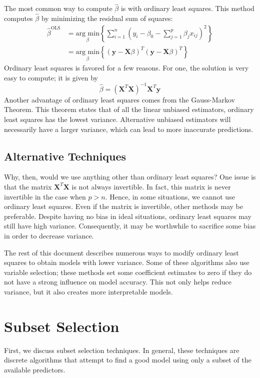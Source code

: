 \documentclass{article}
\newcommand{\argmin}[1]{\underset{\beta}{\text{arg min}}}
\begin{document}
The most common way to compute $\hat{\beta}$ is with ordinary least squares. This method computes $\hat{\beta}$ by minimizing the residual sum of squares:
\begin{align}
	\hat{\beta}^{\text{OLS}} &= \argmin{\beta}\left\{\sum_{i=1}^{n} \left( y_i - \beta_0 - \sum_{j=1}^{p} \beta_jx_{ij} \right)^2 \right\}\\
	&= \argmin{\beta} \left\{ (\mathbf{y} - \mathbf{X}\beta)^{T} (\mathbf{y} - \mathbf{X}\beta)^{T} \right\}
\end{align}
Ordinary least squares is favored for a few reasons. For one, the solution is very easy to compute; it is given by
\begin{equation}
	\hat{\beta} = (\mathbf{X}^{T}\mathbf{X})^{-1}\mathbf{X}^{T}\mathbf{y}
\end{equation}
Another advantage of ordinary least squares comes from the Gauss-Markov Theorem. This theorem states that of all the linear unbiased estimators, ordinary least squares has the lowest variance. Alternative unbiased estimators will necessarily have a larger variance, which can lead to more inaccurate predictions.

\subsection{Alternative Techniques}

Why, then, would we use anything other than ordinary least squares? One issue is that the matrix $\mathbf{X}^T\mathbf{X}$ is not always invertible. In fact, this matrix is never invertible in the case when $p>n$. Hence, in some situations, we cannot use ordinary least squares. Even if the matrix is invertible, other methods may be preferable. Despite having no bias in ideal situations, ordinary least squares may still have high variance. Consequently, it may be worthwhile to sacrifice some bias in order to decrease variance.

The rest of this document describes numerous ways to modify ordinary least squares to obtain models with lower variance. Some of these algorithms also use variable selection; these methods set some coefficient estimates to zero if they do not have a strong influence on model accuracy. This not only helps reduce variance, but it also creates more interpretable models. 

\section{Subset Selection}
First, we discuss subset selection techniques. In general, these techniques are discrete algorithms that attempt to find a good model using only a subset of the available predictors.
\end{document}

